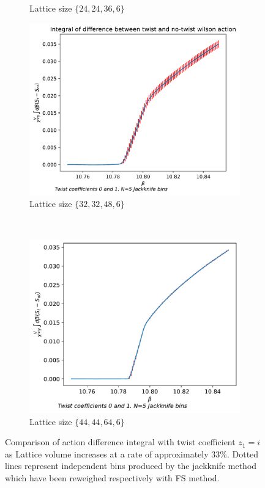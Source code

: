 \documentclass[english,twoside,openright]{UH_TCM_MSc}
\begin{document}
\begin{figure}[htpb]
\begin{subfigure}[t]{0.5\textwidth}
        \caption{Lattice size $\{24,24,36,6\}$}
    \end{subfigure}
    \begin{subfigure}[t]{0.5\textwidth}
        \centering
        \includegraphics[width=\textwidth]{final_plots/32_32_48/action_diff_int.pdf}
        \caption{Lattice size $\{32,32,48,6\}$}
    \end{subfigure}%
    ~ 
    \begin{subfigure}[t]{0.5\textwidth}
        \centering
        \includegraphics[width=\textwidth]{final_plots/44_44_64/action_diff_int_0-1.pdf}
        \caption{Lattice size $\{44,44,64,6\}$}
    \end{subfigure}
    \caption{Comparison of action difference integral with twist coefficient $z_1=i$ as Lattice volume increases at a rate of approximately $33$\%. Dotted lines represent independent bins produced by the jackknife method which have been reweighed respectively with FS method.} 
\end{figure}
\end{document}
